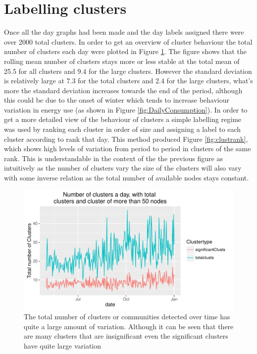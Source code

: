 \section{Labelling clusters}
\label{sec:labelling}
Once all the day graphs had been made and the day labels assigned there were over 2000 total clusters. In order to get an overview of cluster behaviour the total number of clusters each day were plotted in Figure \ref{fig:Total_Clusters}. The figure shows that the rolling mean number of clusters stays more or less stable at the total mean of 25.5 for all clusters and 9.4 for the large clusters. However the standard deviation is relatively large at 7.3 for the total clusters and 2.4 for the large clusters, what's more the standard deviation increases towards the end of the period, although this could be due to the onset of winter which tends to increase behaviour variation in energy use (as shown in Figure \ref{fig:DailyConsumption}). In order to get a more detailed view of the behaviour of clusters a simple labelling regime was used by ranking each cluster in order of size and assigning a label to each cluster according to rank that day. This method produced Figure \ref{fig:clustrank}, which shows high levels of variation from period to period in clusters of the same rank. This is understandable in the context of the the previous figure as intuitively as the number of clusters vary the size of the clusters will also vary with some inverse relation as the total number of available nodes stays constant.



\begin{figure}[ht]
    \centering
    \includegraphics[width=\textwidth]{Figures/Results/TotalClusters}
    \caption[Total clusters over time]{The total number of clusters or communities detected over time has quite a large amount of variation. Although it can be seen that there are many clusters that are insignificant even the significant clusters have quite large variation }
    \label{fig:Total_Clusters}
\end{figure}

